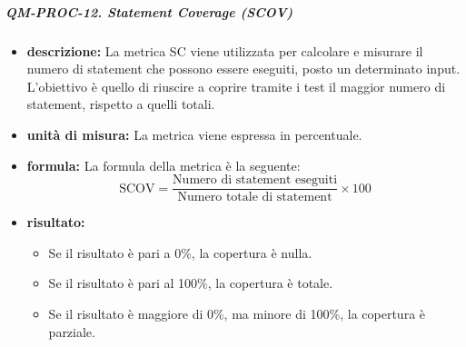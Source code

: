             \subparagraph{QM-PROC-12. Statement Coverage (SCOV)}
            \begin{itemize}
                \item \textbf{descrizione: }
                La metrica SC viene utilizzata per calcolare e misurare il numero di statement che possono essere eseguiti, posto un determinato input. L'obiettivo è quello di riuscire a coprire tramite i test il maggior numero di statement, rispetto a quelli totali.

                \item \textbf{unità di misura: }
                La metrica viene espressa in percentuale.

                \item \textbf{formula: }
                La formula della metrica è la seguente:
                \[
                    \text{SCOV} = \frac{\text{Numero di statement eseguiti}}{\text{Numero totale di statement}} \times 100
                \]

                \item \textbf{risultato: }
                \begin{itemize}
                    \item Se il risultato è pari a 0\%, la copertura è nulla.
                    \item Se il risultato è pari al 100\%, la copertura è totale.
                    \item Se il risultato è maggiore di 0\%, ma minore di 100\%, la copertura è parziale.
                \end{itemize}
            \end{itemize}

